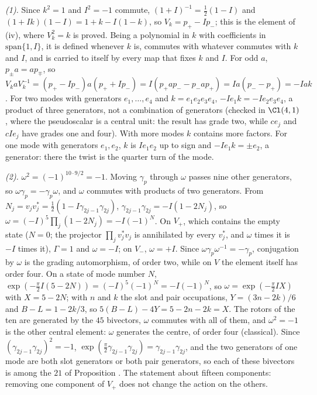 \emph{(1).} Since $k^{2} = 1$ and $I^{2} = -1$ commute, $(1 + I)^{-1} = \tfrac12(1 - I)$ and $(1 + Ik)(1 - I) = 1 + k - I(1 - k)$, so $V_{k} = p_{+} - Ip_{-}$; this is the element of (iv), where $V_{k}^{2} = k$ is proved. Being a polynomial in $k$ with coefficients in $\mathrm{span}\{1, I\}$, it is defined whenever $k$ is, commutes with whatever commutes with $k$ and $I$, and is carried to itself by every map that fixes $k$ and $I$. For odd $a$, $p_{\pm}a = ap_{\mp}$, so $V_{k}aV_{k}^{-1} = (p_{+} - Ip_{-})a(p_{+} + Ip_{-}) = I(p_{+}ap_{-} - p_{-}ap_{+}) = Ia(p_{-} - p_{+}) = -Iak$. For two modes with generators $e_{1}, \dots, e_{4}$ and $k = e_{1}e_{2}e_{3}e_{4}$, $-Ie_{1}k = -Ie_{2}e_{3}e_{4}$, a product of three generators, not a combination of generators (checked in $\Cl(4,1)$, where the pseudoscalar is a central unit: the result has grade two, while $ce_{j}$ and $cIe_{j}$ have grades one and four). With more modes $k$ contains more factors. For one mode with generators $e_{1}, e_{2}$, $k$ is $I e_{1}e_{2}$ up to sign and $-Ie_{1}k = \pm e_{2}$, a generator: there the twist is the quarter turn of the mode.

\emph{(2).} $\omega^{2} = (-1)^{10\cdot 9/2} = -1$. Moving $\gamma_{p}$ through $\omega$ passes nine other generators, so $\omega\gamma_{p} = -\gamma_{p}\omega$, and $\omega$ commutes with products of two generators. From $N_{j} = v_{j}v_{j}^{*} = \tfrac12(1 - I\gamma_{2j-1}\gamma_{2j})$, $\gamma_{2j-1}\gamma_{2j} = -I(1 - 2N_{j})$, so $\omega = (-I)^{5}\prod_{j}(1 - 2N_{j}) = -I(-1)^{N}$. On $V_{+}$, which contains the empty state ($N = 0$; the projector $\prod_{j}v_{j}^{*}v_{j}$ is annihilated by every $v_{j}^{*}$, and $\omega$ times it is $-I$ times it), $\Gamma = 1$ and $\omega = -I$; on $V_{-}$, $\omega = +I$. Since $\omega\gamma_{p}\omega^{-1} = -\gamma_{p}$, conjugation by $\omega$ is the grading automorphism, of order two, while on $V$ the element itself has order four. On a state of mode number $N$, $\exp(-\tfrac{\pi}{2}I(5 - 2N)) = (-I)^{5}(-1)^{N} = -I(-1)^{N}$, so $\omega = \exp(-\tfrac{\pi}{2}IX)$ with $X = 5 - 2N$; with $n$ and $k$ the slot and pair occupations, $Y = (3n - 2k)/6$ and $B - L = 1 - 2k/3$, so $5(B - L) - 4Y = 5 - 2n - 2k = X$. The rotors of the ten are generated by the $45$ bivectors, $\omega$ commutes with all of them, and $\omega^{2} = -1$ is the other central element: $\omega$ generates the centre, of order four (classical). Since $(\gamma_{2j-1}\gamma_{2j})^{2} = -1$, $\exp(\tfrac{\pi}{2}\gamma_{2j-1}\gamma_{2j}) = \gamma_{2j-1}\gamma_{2j}$, and the two generators of one mode are both slot generators or both pair generators, so each of these bivectors is among the $21$ of Proposition . The statement about fifteen components: removing one component of $V_{+}$ does not change the action on the others.

